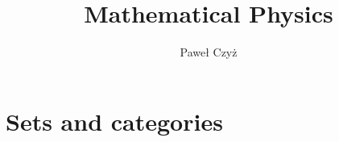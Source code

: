 \documentclass[envcountsame,envcountchap]{svmono}
\begin{document}
\author{Paweł Czyż}
\title{Mathematical Physics}
\maketitle

\frontmatter %

% 
% 

\tableofcontents

\mainmatter %

% 
\part{Sets and categories}


%

\backmatter%

\printindex

\end{document}
